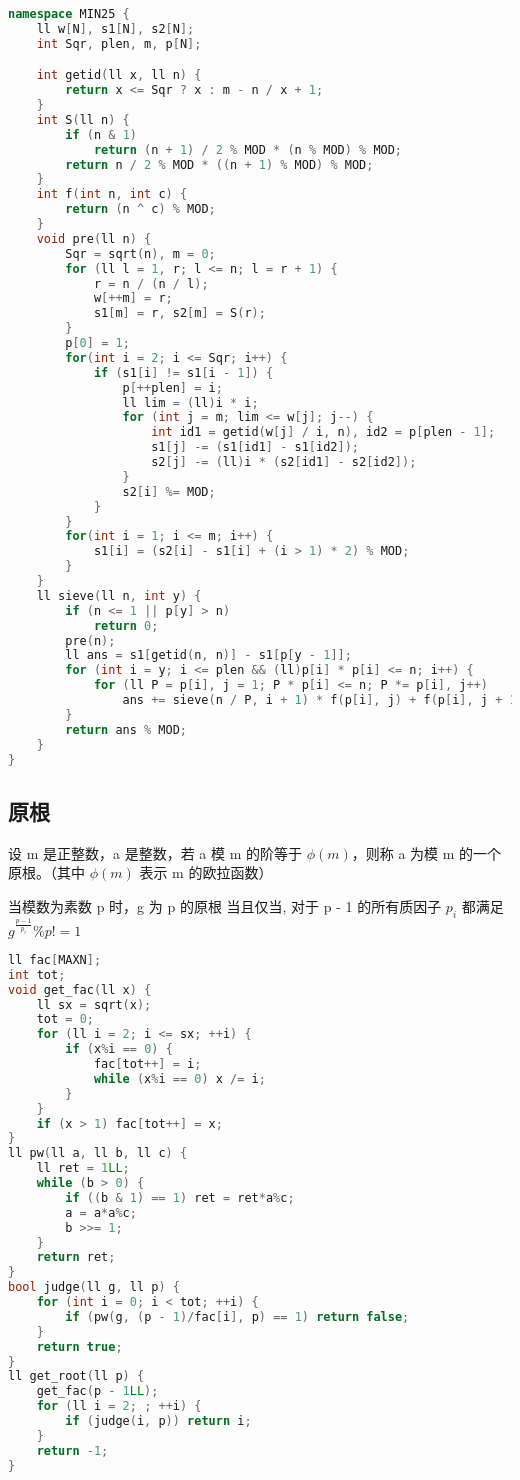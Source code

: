 \begin{lstlisting}[language=C++]
namespace MIN25 {
    ll w[N], s1[N], s2[N];
    int Sqr, plen, m, p[N];

    int getid(ll x, ll n) {
        return x <= Sqr ? x : m - n / x + 1;
    }
    int S(ll n) {
        if (n & 1)
            return (n + 1) / 2 % MOD * (n % MOD) % MOD;
        return n / 2 % MOD * ((n + 1) % MOD) % MOD;
    }
    int f(int n, int c) {
        return (n ^ c) % MOD;
    }
    void pre(ll n) {
        Sqr = sqrt(n), m = 0;
        for (ll l = 1, r; l <= n; l = r + 1) {
            r = n / (n / l);
            w[++m] = r;
            s1[m] = r, s2[m] = S(r);
        }
        p[0] = 1;
        for(int i = 2; i <= Sqr; i++) {
            if (s1[i] != s1[i - 1]) {
                p[++plen] = i;
                ll lim = (ll)i * i;
                for (int j = m; lim <= w[j]; j--) {
                    int id1 = getid(w[j] / i, n), id2 = p[plen - 1];
                    s1[j] -= (s1[id1] - s1[id2]);
                    s2[j] -= (ll)i * (s2[id1] - s2[id2]);
                }
                s2[i] %= MOD;
            }
        }
        for(int i = 1; i <= m; i++) {
            s1[i] = (s2[i] - s1[i] + (i > 1) * 2) % MOD;
        }
    }
    ll sieve(ll n, int y) {
        if (n <= 1 || p[y] > n)
            return 0;
        pre(n);
        ll ans = s1[getid(n, n)] - s1[p[y - 1]];
        for (int i = y; i <= plen && (ll)p[i] * p[i] <= n; i++) {
            for (ll P = p[i], j = 1; P * p[i] <= n; P *= p[i], j++)
                ans += sieve(n / P, i + 1) * f(p[i], j) + f(p[i], j + 1);
        }
        return ans % MOD;
    }
}
\end{lstlisting}


\subsection{原根}

设 m 是正整数，a 是整数，若 a 模 m 的阶等于 $\phi (m)$，则称 a 为模 m 的一个原根。（其中 $\phi (m)$ 表示 m 的欧拉函数）

当模数为素数 p 时，g 为 p 的原根 当且仅当, 对于 p - 1 的所有质因子 $p _ i$ 都满足 $g ^ {\frac{p - 1}{p _ i}} \% p != 1$

\begin{lstlisting}[language=C++]
ll fac[MAXN];
int tot;
void get_fac(ll x) {
    ll sx = sqrt(x);
    tot = 0;
    for (ll i = 2; i <= sx; ++i) {
        if (x%i == 0) {
            fac[tot++] = i;
            while (x%i == 0) x /= i;
        }
    }
    if (x > 1) fac[tot++] = x;
}
ll pw(ll a, ll b, ll c) {
    ll ret = 1LL;
    while (b > 0) {
        if ((b & 1) == 1) ret = ret*a%c;
        a = a*a%c;
        b >>= 1;
    }
    return ret;
}
bool judge(ll g, ll p) {
    for (int i = 0; i < tot; ++i) {
        if (pw(g, (p - 1)/fac[i], p) == 1) return false;
    }
    return true;
}
ll get_root(ll p) {
    get_fac(p - 1LL);
    for (ll i = 2; ; ++i) {
        if (judge(i, p)) return i;
    }
    return -1;
}
\end{lstlisting}
